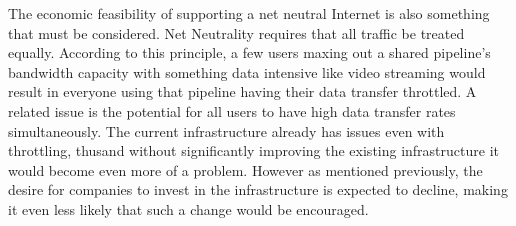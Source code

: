 \documentclass{sigcomm-alternate}
\begin{document}
The economic feasibility of supporting a net neutral Internet is also something that must be considered. Net Neutrality requires that all traffic be treated equally. According to this principle, a few users maxing out a shared pipeline’s bandwidth capacity with something data intensive like video streaming would result in everyone using that pipeline having their data transfer throttled. A related issue is the potential for all users to have high data transfer rates simultaneously. The current infrastructure already has issues even with throttling, thusand without significantly improving the existing infrastructure it would become even more of a problem. However as mentioned previously, the desire for companies to invest in the infrastructure is expected to decline, making it even less likely that such a change would be encouraged.
\cite{paradox}





\end{document}
